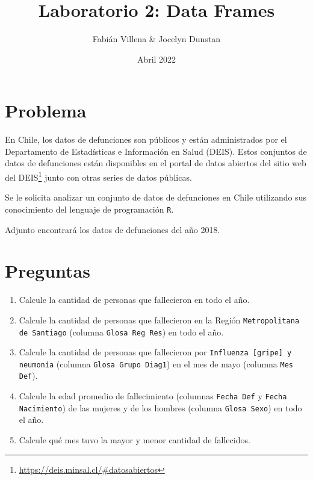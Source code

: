 \documentclass{article}
\title{Laboratorio 2: Data Frames}
\author{Fabián Villena \& Jocelyn Dunstan}
\date{Abril 2022}
\begin{document}
\maketitle

\section{Problema}

En Chile, los datos de defunciones son públicos y están administrados por el Departamento de Estadísticas e Información en Salud (DEIS). Estos conjuntos de datos de defunciones están disponibles en el portal de datos abiertos del sitio web del DEIS\footnote{\url{https://deis.minsal.cl/\#datosabiertos}} junto con otras series de datos públicas.

Se le solicita analizar un conjunto de datos de defunciones en Chile utilizando sus conocimiento del lenguaje de programación \texttt{R}.

Adjunto encontrará los datos de defunciones del año 2018.

\begin{center}
\end{center}

\section{Preguntas}

\begin{enumerate}
    \item Calcule la cantidad de personas que fallecieron en todo el año.
    \item Calcule la cantidad de personas que fallecieron en la Región \texttt{Metropolitana de Santiago} (columna \texttt{Glosa Reg Res}) en todo el año.
    \item Calcule la cantidad de personas que fallecieron por \texttt{Influenza [gripe] y neumonía} (columna \texttt{Glosa Grupo Diag1}) en el mes de mayo (columna \texttt{Mes Def}).
    \item Calcule la edad promedio de fallecimiento (columnas \texttt{Fecha Def} y \texttt{Fecha Nacimiento}) de las mujeres y de los hombres (columna \texttt{Glosa Sexo}) en todo el año.
    \item Calcule qué mes tuvo la mayor y menor cantidad de fallecidos.
\end{enumerate}
\end{document}

